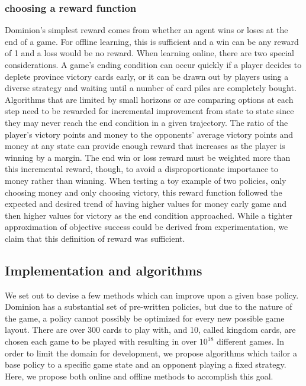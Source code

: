 \documentclass{article}
\begin{document}
\subsubsection{choosing a reward function}
Dominion’s simplest reward comes from whether an agent wins or loses at the end of a game. For offline learning, this is sufficient and a win can be any reward of 1 and a loss would be no reward. When learning online, there are two special considerations. A game’s ending condition can occur quickly if a player decides to deplete province victory cards early, or it can be drawn out by players using a diverse strategy and waiting until a number of card piles are completely bought. Algorithms that are limited by small horizons or are comparing options at each step need to be rewarded for incremental improvement from state to state since they may never reach the end condition in a given trajectory. The ratio of the player’s victory points and money to the opponents’ average victory points and money at any state can provide enough reward that increases as the player is winning by a margin. The end win or loss reward must be weighted more than this incremental reward, though, to avoid a disproportionate importance to money rather than winning. When testing a toy example of two policies, only choosing money and only choosing victory, this reward function followed the expected and desired trend of having higher values for money early game and then higher values for victory as the end condition approached. While a tighter approximation of objective success could be derived from experimentation, we claim that this definition of reward was sufficient.
\subsection{Implementation and algorithms}
We set out to devise a few methods which can improve upon a given base policy. Dominion has a substantial set of pre-written policies, but due to the nature of the game, a policy cannot possibly be optimized for every new possible game layout. There are over 300 cards to play with, and 10, called kingdom cards, are chosen each game to be played with resulting in over \(10^{18}\) different games. In order to limit the domain for development, we propose algorithms which tailor a base policy to a specific game state and an opponent playing a fixed strategy. Here, we propose both online and offline methods to accomplish this goal.
\end{document}

